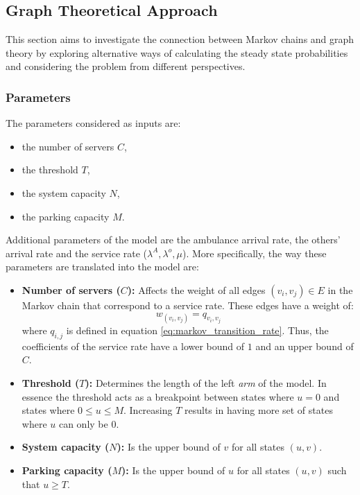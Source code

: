 \subsection{Graph Theoretical Approach}

This section aims to investigate the connection between Markov chains and graph 
theory by exploring alternative ways of calculating the steady state probabilities 
and considering the problem from different perspectives.

\subsubsection{Parameters}
The parameters considered as inputs are:
\begin{multicols}{2}
    \begin{itemize}
        \item the number of servers \(C\),
        \item the threshold \(T\), 
        \item the system capacity \(N\),
        \item the parking capacity \(M\). 
    \end{itemize}
\end{multicols}

Additional parameters of the model are the ambulance arrival rate, the others' 
arrival rate and the service rate (\(\lambda^A, \lambda^o, \mu\)). 
More specifically, the way these parameters are translated into the model are:

\begin{itemize}
    \item \textbf{Number of servers (\(C\)):} Affects the weight of all edges 
    \((v_i, v_j) \in E\) in the Markov chain that correspond to a service rate. 
    These edges have a weight of: 
    \begin{equation*}
        w_{(v_i, v_j)} = q_{v_i, v_j}
    \end{equation*}
    where \(q_{i,j}\) is defined in equation \ref{eq:markov_transition_rate}.
    Thus, the coefficients of the service rate have a lower bound of \(1\) and 
    an upper bound of \(C\).
    \item \textbf{Threshold (\(T\)):} Determines the length of the left 
    \textit{arm} of the model. 
    In essence the threshold acts as a breakpoint between states where \(u=0\) 
    and states where \(0 \leq u \leq M\). 
    Increasing \(T\) results in having more set of states where \(u\) can only 
    be \(0\).
    \item \textbf{System capacity (\(N\)):} Is the upper bound of \(v\) for all 
    states \((u,v)\).
    \item \textbf{Parking capacity (\(M\)):} Is the upper bound of \(u\) for all 
    states \((u,v)\) such that \(u \geq T\).
\end{itemize}


